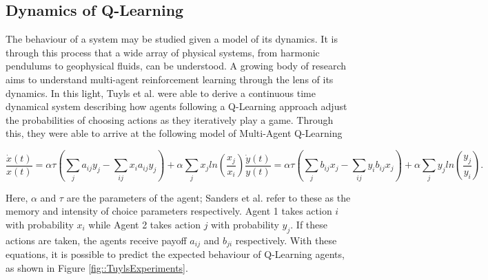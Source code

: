 \documentclass[letterpaper]{article} %
\begin{document}
\subsection{Dynamics of Q-Learning}

The behaviour of a system may be studied given a model of its
    dynamics. It is through this process that a wide array of physical
    systems, from harmonic pendulums to geophysical fluids, can be
    understood. A growing body of research aims to understand
    multi-agent reinforcement learning through the lens of its
    dynamics. In this light, Tuyls et al. \cite{Tuyls2006AnGames} were able to derive a continuous time dynamical
system describing how agents following a Q-Learning approach adjust the probabilities of choosing actions
as they iteratively play a game.  Through this, they were able to
    arrive at the following model of Multi-Agent Q-Learning

    \begin{subequations}
    \label{eqn::EOM}
        \begin{equation}
            \frac{\dot{x}(t)}{x(t)} = \alpha \tau (\sum_{j} a_{ij} y_j - \sum_{i j} x_i a_{ij} y_j)
            + \alpha \sum_j x_j ln(\frac{x_j}{x_i}) 
        \end{equation}
        \begin{equation}
            \frac{\dot{y}(t)}{y(t)} = \alpha \tau (\sum_{j} b_{ij} x_j - \sum_{i j} y_i b_{ij} x_j)
            + \alpha \sum_j y_j ln(\frac{y_j}{y_i}).
        \end{equation}
    \end{subequations}

    Here, $\alpha$ and $\tau$ are the parameters of the agent; Sanders et al. refer to these as the
    memory and intensity of choice parameters respectively. Agent 1 takes action $i$ with probability
    $x_i$ while Agent 2 takes action $j$ with probability $y_j$. If these actions are taken, the agents
    receive payoff $a_{ij}$ and $b_{ji}$ respectively. With these equations, it is possible to
    predict the expected behaviour of Q-Learning agents, as shown in Figure 
    \ref{fig::TuylsExperiments}.
\end{document}
